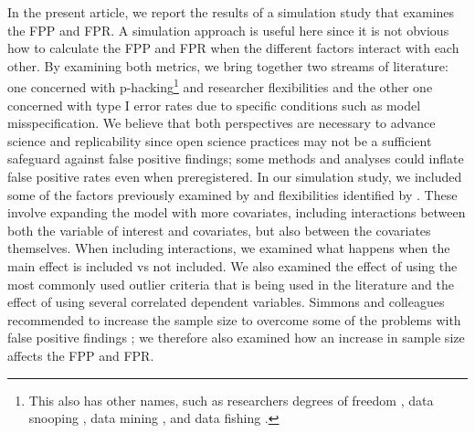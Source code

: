 In the present article, we report the results of a simulation study that examines the FPP and FPR. A simulation approach is useful here since it is not obvious how to calculate the FPP and FPR when the different factors interact with each other. By examining both metrics, we bring together two streams of literature: one concerned with p-hacking\footnote{This also has other names, such as researchers degrees of freedom \citep{Simmons2011}, data snooping \citep{white2000reality}, data mining \citep{lovell1983}, and data fishing \citep{selvin1966data}.} \citep{simonsohn2014p} and researcher flexibilities and the other one concerned with type I error rates due to specific conditions such as model misspecification. We believe that both perspectives are necessary to advance science and replicability since open science practices may not be a sufficient safeguard against false positive findings; some methods and analyses could inflate false positive rates even when preregistered. In our simulation study, we included some of the factors previously examined by \cite{Simmons2011} and flexibilities identified by \cite{Wicherts2016}. These involve expanding the model with more covariates, including interactions between both the variable of interest and covariates, but also between the covariates themselves. When including interactions, we examined what happens when the main effect is included vs not included. We also examined the effect of using the most commonly used outlier criteria that is being used in the literature \citep{Leyes2013} and the effect of using several correlated dependent variables. Simmons and colleagues recommended to increase the sample size to overcome some of the problems with false positive findings \citep{Simmons2011}; we therefore also examined how an increase in sample size affects the FPP and FPR. 
